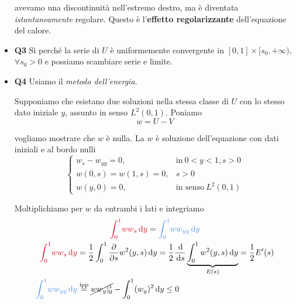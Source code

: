 \documentclass[10pt,a4paper,twoside,openright]{book}
\newcommand{\de}{\,\mathrm d}
\newcommand{\dy}{\de y}
\newcommand{\ds}{\de s}
\begin{document}
\begin{itemize}
avevamo una discontinuità nell'estremo destro, ma è diventata \textit{istantaneamente} regolare. Questo è l'\textbf{effetto regolarizzante} dell'equazione del calore.
\item \textbf{Q3} Sì perché la serie di $U$ è uniformemente convergente in $[ 0,1] \times [ s_{0},+\infty)$, $\forall s_{0}  >0$ e possiamo scambiare serie e limite.
\item \textbf{Q4} Usiamo il \textit{metodo dell'energia.}

Supponiamo che esistano due soluzioni nella stessa classe di $U$ con lo stesso dato iniziale $y$, assunto in senso $L^{2}(0,1)$. Poniamo
\begin{equation*}
    w=U-V
\end{equation*}

vogliamo mostrare che $w$ è nulla. La $w$ è soluzione dell'equazione con dati iniziali e al bordo nulli
\begin{equation*}
    \begin{cases}
        w_{s} -w_{yy} =0,  & \text{in} \ 0< y< 1,s >0     \\
        w(0,s) =w(1,s) =0, & \boxed{s >0}                 \\
        w(y,0) =0,         & \text{in senso} \ L^{2}(0,1)
    \end{cases}
\end{equation*}

Moltiplichiamo per $w$ da entrambi i lati e integriamo
\begin{gather*}
    \textcolor[rgb]{0.82,0.01,0.11}{\int ^{1}_{0}}\textcolor[rgb]{0.82,0.01,0.11}{ww}\textcolor[rgb]{0.82,0.01,0.11}{_{s}}\textcolor[rgb]{0.82,0.01,0.11}{\dy} =\textcolor[rgb]{0.29,0.56,0.89}{\int ^{1}_{0}}\textcolor[rgb]{0.29,0.56,0.89}{ww}\textcolor[rgb]{0.29,0.56,0.89}{_{yy}}\textcolor[rgb]{0.29,0.56,0.89}{\dy}\\
    \begin{aligned}
        \textcolor[rgb]{0.82,0.01,0.11}{\int ^{1}_{0}}\textcolor[rgb]{0.82,0.01,0.11}{ww}\textcolor[rgb]{0.82,0.01,0.11}{_{s}}\textcolor[rgb]{0.82,0.01,0.11}{\dy}  & =\frac{1}{2}\int ^{1}_{0}\frac{\partial }{\partial s} w^{2}(y,s) \dy=\frac{1}{2}\frac{\de}{\ds}\underbrace{\int ^{1}_{0} w^{2}(y,s) \dy}_{E(s)} =\frac{1}{2} E'(s) \\
        \textcolor[rgb]{0.29,0.56,0.89}{\int ^{1}_{0}}\textcolor[rgb]{0.29,0.56,0.89}{ww}\textcolor[rgb]{0.29,0.56,0.89}{_{yy}}\textcolor[rgb]{0.29,0.56,0.89}{\dy} & \overset{\text{ipp}}{=}\cancel{ww_{y} |^{1}_{0}} -\int ^{1}_{0}(w_{y})^{2} \dy\leqslant 0
    \end{aligned}
\end{gather*}


\end{itemize}
\end{document}
